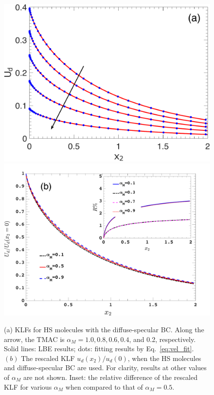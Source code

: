 \begin{figure}[t]
	\centering
	\includegraphics[scale=0.32]{SlipJump/IMG/KLF_am}
	\hskip 0.5cm
	\includegraphics[scale=0.2]{SlipJump/IMG/KLF_similarity}
	\caption{
		(a) KLFs for HS molecules with the diffuse-specular BC. Along the arrow, the TMAC is $\alpha_M=1.0, 0.8, 0.6, 0.4$, and 0.2, respectively. Solid lines: LBE results; dots: fitting results by Eq.~\eqref{eq:vel_fit}.   $(b)$ The rescaled KLF $u_d(x_2)/u_d(0)$, when the HS molecules and diffuse-specular BC are used. For clarity, results at other values of $\alpha_M$ are not shown. Inset: the relative difference of the rescaled KLF for various $\alpha_M$ when compared to that of $\alpha_M=0.5$. }\label{fig:KLF_sim}
\end{figure}

